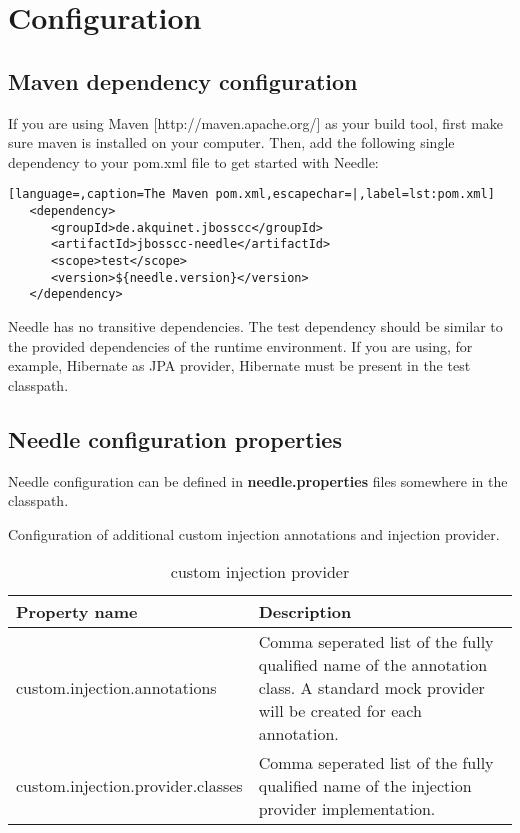 \chapter{Configuration}

\section{Maven dependency configuration}
If you are using Maven [http://maven.apache.org/] as your build tool, first make sure maven is installed on your computer. Then, add the following single dependency to your pom.xml file to get started with Needle:

\begin{lstlisting}[language=,caption=The Maven pom.xml,escapechar=|,label=lst:pom.xml]
   <dependency>
      <groupId>de.akquinet.jbosscc</groupId>
      <artifactId>jbosscc-needle</artifactId>
      <scope>test</scope>
      <version>${needle.version}</version>
   </dependency>
\end{lstlisting}

Needle has no transitive dependencies. The test dependency should be similar to the provided dependencies of the runtime environment. If you are using, for example, Hibernate as JPA provider, Hibernate must be present in the test classpath.

\section{Needle configuration properties}

Needle configuration can be defined in \textbf{needle.properties} files somewhere in the classpath.

\parskip 14pt
\parindent 0pt
Configuration of additional custom injection annotations and injection provider.
\begin{table}[H]
\centering
\begin{tabular}{p{6cm}p{11cm}} \toprule 
    \textbf{Property name} & \textbf{Description} \\ \midrule
    custom.injection.annotations & Comma seperated list of the fully qualified name of the annotation class. A standard mock provider will be created for each annotation. \\
    custom.injection.provider.classes & Comma seperated list of the fully qualified name of the injection provider implementation. \\
\bottomrule
\end{tabular}
\caption{custom injection provider}
\end{table}

